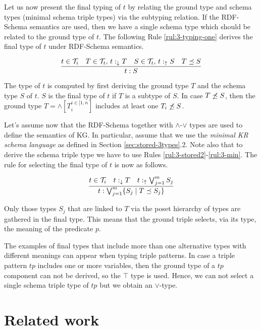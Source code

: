 \documentclass[runningheads]{llncs}
\newcommand{\darr}{\downarrow}
\newcommand{\uarr}{\uparrow}
\newcommand{\T}{{\cal T}}
\begin{document}
Let us now present the final typing of $t$ by relating the ground type and
schema types (minimal schema triple types) via the subtyping relation. If
the RDF-Schema semantics are used, then we have a single schema type
which should be related to the ground type of $t$. The following Rule
\ref{rul:3-typing-one} derives the final type of $t$ under RDF-Schema
semantics. 

\begin{equation}
\label{rul:3-typing-one}
\dfrac{t\in\T_i\quad T\in\T_t,\, t:_{\darr}T\quad S\in\T_t,\, t:_\uarr\/S\quad T\preceq\/S}
      {t:S}
\end{equation}

The type of $t$ is computed by first deriving the ground type $T$ and
the schema type $S$ of $t$. $S$ is the final type of $t$ if $T$ is a
subtype of $S$. In case $T\not\preceq\/S$, then the ground type
$T=\land[T_i^{i\in[1,n}]$ includes at least one $T_i\not\preceq\/S$.

Let's assume now that the RDF-Schema together with $\land$-$\lor$
types are used to define the semantics of KG. In particular, assume
that we use the \emph{minimal KR schema language} as defined in
Section \ref{sec:stored-3types}.2. Note also that to derive the schema
triple type we have to use Rules
\ref{rul:3-stored2}-\ref{rul:3-min}. The rule for selecting the final
type of $t$ is now as follows.

\begin{equation}
\label{rul:3-typing-two}
\dfrac{t\in\T_i\quad t:_{\darr}T\quad\/t:_\uarr\bigvee_{j=1}^{m}\/S_j}
      {t:\bigvee_{j=1}^m\{S_j \mid T\preceq\/S_j\}}
\end{equation}

Only those types $S_j$ that are linked to $T$ via the poset hierarchy
of types are gathered in the final type. This means that the ground
triple selects, via its type, the meaning of the predicate $p$.

The examples of final types that include more than one alternative
types with different meanings can appear when typing triple
patterns. In case a triple pattern $tp$ includes one or more
variables, then the ground type of a $tp$ component can not be
derived, so the $\top$ type is used. Hence, we can not select a
single schema triple type of $tp$ but we obtain an $\lor$-type.






\section{Related work\label{sec:related}}
\end{document}
